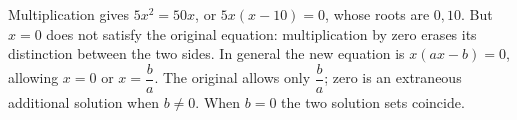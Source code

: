 Multiplication gives $5x^2=50x$, or $5x(x-10)=0$, whose roots are $0,10$. But $x=0$ does not satisfy the original equation: multiplication by zero erases its distinction between the two sides. In general the new equation is $x(ax-b)=0$, allowing $x=0$ or $x=\dfrac{b}{a}$. The original allows only $\dfrac{b}{a}$; zero is an extraneous additional solution when $b\ne0$. When $b=0$ the two solution sets coincide.
